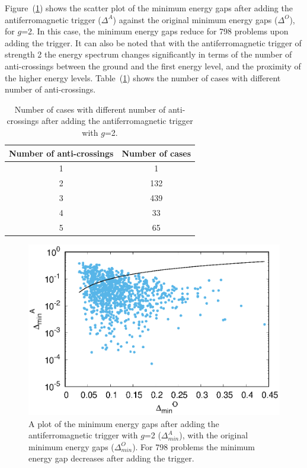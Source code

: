\documentclass[../main.tex]{subfiles}
\begin{document}
Figure~(\ref{fig:a39}) shows the scatter plot of the minimum energy gaps after adding the antiferromagnetic trigger ($\Delta^A$) against the original minimum energy gaps ($\Delta^O$), for $g$=2. In this case, the minimum energy gaps reduce for 798 problems upon adding the trigger. It can also be noted that with the antiferromagnetic trigger of strength 2 the energy spectrum changes significantly in terms of the number of anti-crossings between the ground and the first energy level, and the proximity of the higher energy levels. Table~(\ref{tab:a5}) shows the number of cases with different number of anti-crossings.
\begin{table}[H]
\centering
\renewcommand{\arraystretch}{1.5}
\begin{tabular}{|c|c|}
\hline 
Number of anti-crossings & Number of cases \\ 
\hline 
1 & 1 \\ 
\hline 
2 & 132 \\ 
\hline 
3 & 439 \\ 
\hline 
4 & 33 \\ 
\hline 
5 & 65 \\
\hline
\end{tabular} 
\caption{Number of cases with different number of anti-crossings after adding the antiferromagnetic trigger with $g$=2.}
\label{tab:a5}

\end{table}
\begin{figure}
\centering 
\includegraphics[scale=0.8 ]{MinGap_A_g2.eps}
\caption{A plot of the minimum energy gaps after adding the antiferromagnetic trigger with $g$=2 ($\Delta_{min}^A$), with the original minimum energy gaps ($\Delta_{min}^O$). For 798 problems the minimum energy gap decreases after adding the trigger.}
\label{fig:a39}
\end{figure}
\end{document}
